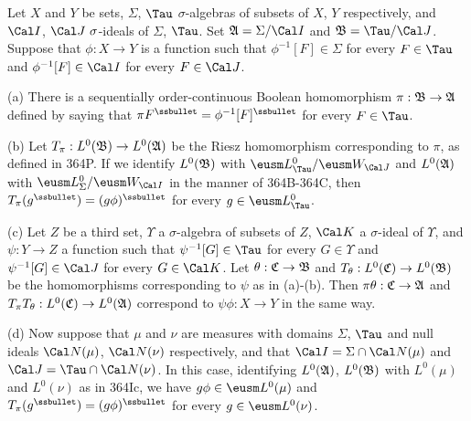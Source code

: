 Let $X$ and $Y$ be sets, $\Sigma$, $\Tau$
$\sigma$-algebras of subsets of $X$, $Y$ respectively, and $\Cal I$,
$\Cal J\,\,\sigma$-ideals of $\Sigma$, $\Tau$.   Set
$\frak A=\Sigma/\Cal I$ and $\frak B=\Tau/\Cal J$.   Suppose that
$\phi:X\to Y$ is
a function such that $\phi^{-1}[F]\in\Sigma$ for every $F\in\Tau$ and
$\phi^{-1}[F]\in\Cal I$ for every $F\in\Cal J$.

(a) There is a
sequentially order-continuous Boolean homomorphism
$\pi:\frak B\to\frak A$ defined by saying that
$\pi F^{\ssbullet}=\phi^{-1}[F]^{\ssbullet}$
for every $F\in\Tau$.

(b) Let $T_{\pi}:L^0(\frak B)\to L^0(\frak A)$ be the
Riesz homomorphism corresponding to $\pi$, as defined in 364P.
If we identify
$L^0(\frak B)$ with $\eusm L^0_{\Tau}/\eusm W_{\Cal J}$ and
$L^0(\frak A)$ with $\eusm L^0_{\Sigma}/\eusm W_{\Cal I}$ in the manner
of 364B-364C, then $T_{\pi}(g^{\ssbullet})=(g\phi)^{\ssbullet}$ for every
$g\in\eusm L^0_{\Tau}$.

(c) Let $Z$ be a third set, $\Upsilon$ a $\sigma$-algebra of subsets of
$Z$, $\Cal K$ a $\sigma$-ideal of $\Upsilon$, and $\psi:Y\to Z$ a function
such that $\psi^{-1}[G]\in\Tau$ for every $G\in\Upsilon$ and
$\psi^{-1}[G]\in\Cal J$ for every $G\in\Cal K$.   Let
$\theta:\frak C\to\frak B$ and $T_{\theta}:L^0(\frak C)\to L^0(\frak B)$ be
the homomorphisms corresponding to $\psi$ as in (a)-(b).   Then
$\pi\theta:\frak C\to\frak A$ and
$T_{\pi}T_{\theta}:L^0(\frak C)\to L^0(\frak A)$ correspond to
$\psi\phi:X\to Y$ in the same way.

(d) Now suppose that $\mu$ and $\nu$ are measures with domains $\Sigma$,
$\Tau$ and null ideals $\Cal N(\mu)$, $\Cal N(\nu)$ respectively, and that
$\Cal I=\Sigma\cap\Cal N(\mu)$ and $\Cal J=\Tau\cap\Cal N(\nu)$.   In this
case, identifying $L^0(\frak A)$, $L^0(\frak B)$ with $L^0(\mu)$ and
$L^0(\nu)$ as in 364Ic, we have $g\phi\in\eusm L^0(\mu)$ and
$T_{\pi}(g^{\ssbullet})=(g\phi)^{\ssbullet}$ for every
$g\in\eusm L^0(\nu)$.

